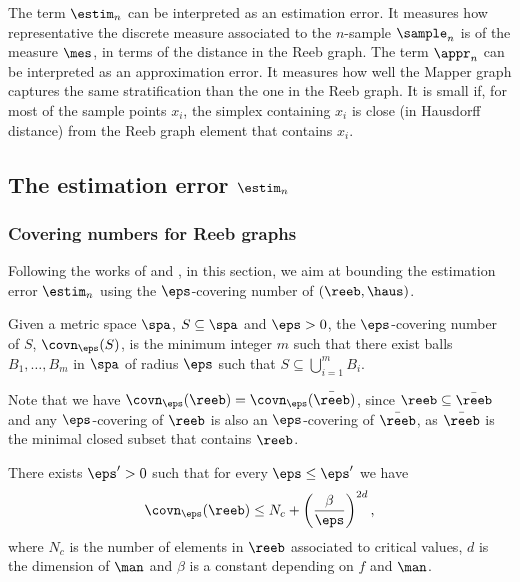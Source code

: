 The term $\estim_n$ can be interpreted as an estimation error. It measures how representative the discrete measure associated to the $n$-sample $\sample_n$ is of the measure $\mes$, in terms of the distance in the Reeb graph. The term $\appr_n$ can be interpreted as an approximation error. It measures how well the Mapper graph captures the same stratification than the one in the Reeb graph. It is small if, for most of the sample points $x_i$, the simplex containing $x_i$ is close (in Hausdorff distance) from the Reeb graph element that contains $x_i$.

 \subsection{The estimation error \texorpdfstring{$\estim_n$}{TEXT} }
 
 \subsubsection{Covering numbers for Reeb graphs}
 
 Following the works of \cite{BoissardLeGouic2014} and \cite{weed2019sharp}, in this section, we aim at bounding the estimation error $\estim_n$ using the $\eps$-covering number of $(\reeb,\haus)$.
 
 \begin{definition}
 Given a metric space $\spa$, $S\subseteq\spa$ and $\eps>0$, the $\eps$-covering number of $S$, $\covn_\eps(S)$, is the minimum integer $m$ such that there exist balls $B_1,\dots,B_m$ in $\spa$ of radius $\eps$ such that $S\subseteq\bigcup_{i=1}^m B_i$.
 \end{definition}
 
 Note that we have $\covn_\eps(\reeb)=\covn_\eps(\bar \reeb)$, since $\reeb\subseteq\bar\reeb$ and any $\eps$-covering of $\reeb$ is also an $\eps$-covering of $\bar\reeb$, as $\bar\reeb$ is the minimal closed subset that contains $\reeb$.
 
 \begin{proposition}\label{prop:covn}
There exists $\eps'>0$ such that for every $\eps\leq\eps'$ we have
  $$\covn_\eps(\reeb)\leq N_c+\left(\frac{\beta}{\eps}\right)^{2d},$$
  where $N_c$ is the number of elements in $\reeb$ associated to critical values, $d$ is the dimension of $\man$ and $\beta$ is a constant depending on $f$ and $\man$. 
 \end{proposition}
 
